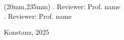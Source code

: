 \begin{textblock*}{80mm}(20mm,235mm) %
  \large\mdseries\sffamily
  {
    . Reviewer: Prof. name \\

    . Reviewer: Prof. name
  }

      \null
  \vspace{4mm}
    \large\mdseries\sffamily
      \noindent
  Konstanz, 2025
\end{textblock*}
